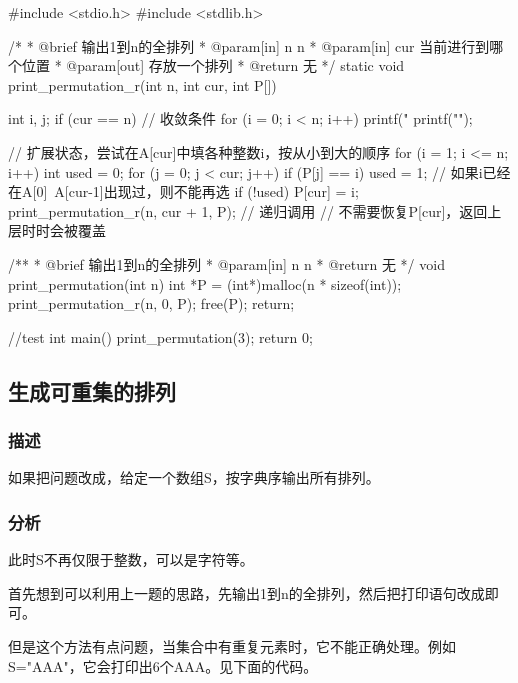 \begin{Codex}[label=print_permutation_n.c]
#include <stdio.h>
#include <stdlib.h>

/*
 * @brief 输出1到n的全排列
 * @param[in] n n
 * @param[in] cur 当前进行到哪个位置
 * @param[out] 存放一个排列
 * @return 无
 */
static void print_permutation_r(int n, int cur, int P[]) {
    int i, j;
    if (cur == n) { // 收敛条件
        for (i = 0; i < n; i++)
            printf("%
        printf("\n");
    }

    // 扩展状态，尝试在A[cur]中填各种整数i，按从小到大的顺序
    for (i = 1; i <= n; i++) {
        int used = 0;
        for (j = 0; j < cur; j++)
            if (P[j] == i)
                used = 1; // 如果i已经在A[0]~A[cur-1]出现过，则不能再选
        if (!used) {
            P[cur] = i;
            print_permutation_r(n, cur + 1, P); // 递归调用
            // 不需要恢复P[cur]，返回上层时时会被覆盖
        }
    }
}

/**
 * @brief 输出1到n的全排列
 * @param[in] n n
 * @return 无
 */
void print_permutation(int n) {
    int *P = (int*)malloc(n * sizeof(int));
    print_permutation_r(n, 0, P);
    free(P);
    return;
}

//test
int main() {
    print_permutation(3);
    return 0;
}
\end{Codex}


\subsection{生成可重集的排列}

\subsubsection{描述}
如果把问题改成，给定一个数组S，按字典序输出所有排列。

\subsubsection{分析}
此时S不再仅限于整数，可以是字符等。

首先想到可以利用上一题的思路，先输出1到n的全排列，然后把打印语句改成即可。

但是这个方法有点问题，当集合中有重复元素时，它不能正确处理。例如S="AAA"，它会打印出6个AAA。见下面的代码。

